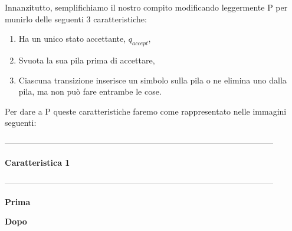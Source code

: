 \documentclass{article}
\begin{document}
Innanzitutto, semplifichiamo il nostro compito modificando leggermente P per
munirlo delle seguenti 3 caratteristiche: 

\begin{enumerate}
    \item Ha un unico stato accettante, $q_{accept}$,
    \item Svuota la sua pila prima di accettare,
    \item Ciascuna transizione inserisce un simbolo sulla pila o ne elimina uno
    dalla pila, ma non può fare entrambe le cose.
\end{enumerate}

Per dare a P queste caratteristiche faremo come rappresentato nelle immagini
seguenti:

\begin{center}

--------------------------------------------------------------------------------------------------

    \textbf{Caratteristica 1}

--------------------------------------------------------------------------------------------------

    \textbf{Prima}


    \textbf{Dopo}



\end{center}
\end{document}
